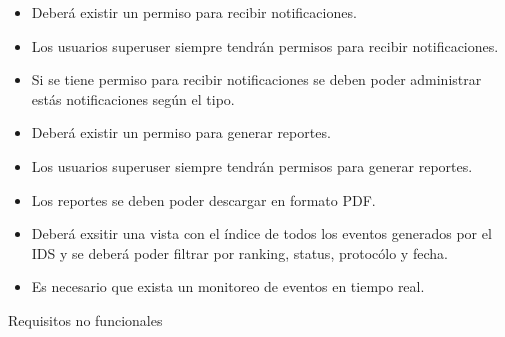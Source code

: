 \begin{itemize}
    \item Deberá existir un permiso para recibir notificaciones.
    \item Los usuarios superuser siempre tendrán permisos para recibir notificaciones.
    \item Si se tiene permiso para recibir notificaciones se deben poder administrar estás notificaciones según el tipo.
    \item Deberá existir un permiso para generar reportes.
    \item Los usuarios superuser siempre tendrán permisos para generar reportes.
    \item Los reportes se deben poder descargar en formato PDF.
    \item Deberá exsitir una vista con el índice de todos los eventos generados por el IDS y se deberá poder filtrar por ranking, status, protocólo y fecha.
    \item Es necesario que exista un monitoreo de eventos en tiempo real.
\end{itemize}

Requisitos no funcionales \\

%
